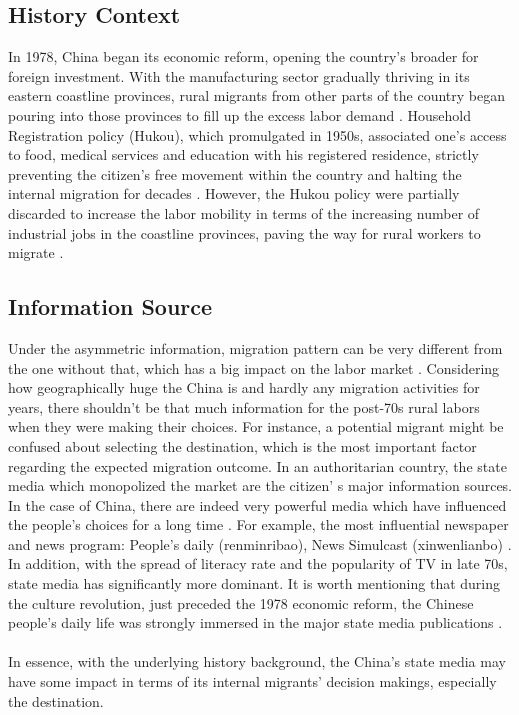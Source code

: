 \documentclass{article}
\begin{document}
\subsection{History Context}
In 1978, China began its economic reform, opening the country's broader for foreign investment. With the manufacturing sector gradually thriving in its eastern coastline provinces, rural migrants from other parts of the country began pouring into those provinces to fill up the excess labor demand \parencite{Chan:2009ch}. Household Registration policy (Hukou), which promulgated in 1950s, associated one's access to food, medical services and education with his registered residence, strictly preventing the citizen's free movement within the country and halting the internal migration for decades \parencite{Cheng:1994os}. However, the Hukou policy were partially discarded to increase the labor mobility in terms of the increasing number of industrial jobs in the coastline provinces, paving the way for rural workers to migrate \parencite{Cai:2001hu}.


\subsection{Information Source}
Under the asymmetric information, migration pattern can be very different from the one without that, which has a big impact on the labor market \parencite{Katz:1987ia}. Considering how geographically huge the China is and hardly any migration activities for years, there shouldn't be that much information for the post-70s rural labors when they were making their choices. For instance, a potential migrant might be confused about selecting the destination, which is the most important factor regarding the expected migration outcome. In an authoritarian country, the state media which monopolized the market are the citizen' s major information sources. In the case of China, there are indeed very powerful media which have influenced the people's choices for a long time  . For example, the most influential newspaper and news program: People's daily (renminribao), News Simulcast (xinwenlianbo) \parencite{Yu:2009mc}. In addition, with the spread of literacy rate and the popularity of TV in late 70s,  state media has significantly more dominant. It is worth mentioning that during the culture revolution, just preceded the 1978 economic reform, the Chinese people's daily life was strongly immersed in the major state media publications \parencite{Leung:2012ic}.
\\~\\
In essence, with the underlying history background, the China's state media may have some impact in terms of its internal migrants' decision makings, especially the destination.
\end{document}
